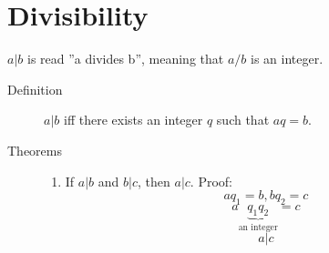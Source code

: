 \section{Divisibility}

$a | b$ is read ''a divides b'', meaning that $a/b$
is an integer.

\begin{description}
    \item[Definition] $a | b$ iff there exists an integer $q$
    such that $aq = b$.

    \item[Theorems]
        \begin{enumerate}
            \item
            If $a | b$ and $b | c$, then $a | c$. Proof:
            $$aq_1 = b, bq_2 = c$$
            $$a\underbrace{q_1q_2}_{\text{an integer}} = c$$
            $$a | c$$
        \end{enumerate}

\end{description}
